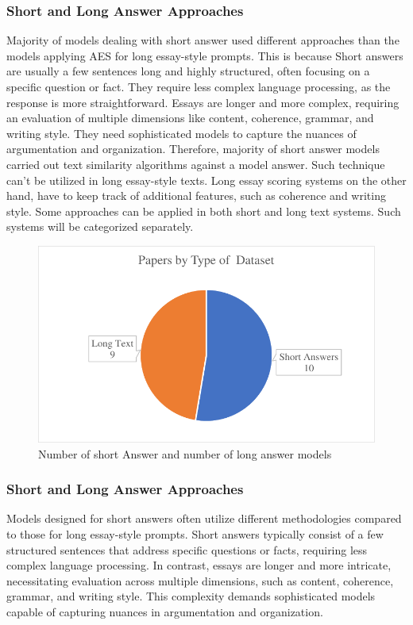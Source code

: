 \documentclass{article}
\begin{document}
	\subsubsection*{Short and Long Answer Approaches}
	Majority of models dealing with short answer used different approaches than the models applying AES for long essay-style prompts. This is because Short answers are usually a few sentences long and highly structured, often focusing on a specific question or fact. They require less complex language processing, as the response is more straightforward. Essays are longer and more complex, requiring an evaluation of multiple dimensions like content, coherence, grammar, and writing style. They need sophisticated models to capture the nuances of argumentation and organization. Therefore, majority of short answer models carried out text similarity algorithms against a model answer. Such technique can't be utilized in long essay-style texts. Long essay scoring systems on the other hand, have to keep track of additional features, such as coherence and writing style. Some approaches can be applied in both short and long text systems. Such systems will be categorized separately.
	\begin{figure}[H]
		\centering
		\includegraphics[width=0.5\linewidth]{img/papersbytype.pdf}
		\caption{Number of short Answer and number of long answer models}
		\label{shortlongcomparison}
	\end{figure}
	\subsubsection*{Short and Long Answer Approaches}
	Models designed for short answers often utilize different methodologies compared to those for long essay-style prompts. Short answers typically consist of a few structured sentences that address specific questions or facts, requiring less complex language processing. In contrast, essays are longer and more intricate, necessitating evaluation across multiple dimensions, such as content, coherence, grammar, and writing style. This complexity demands sophisticated models capable of capturing nuances in argumentation and organization.
	
\end{document}
